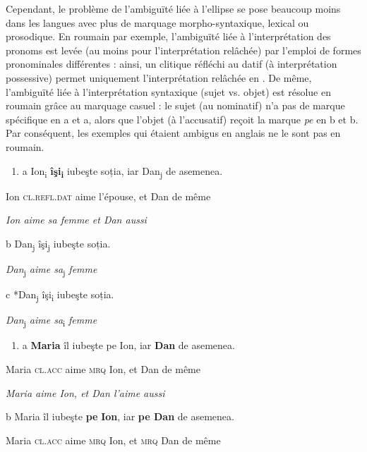 Cependant, le problème de l'ambiguïté liée à l'ellipse se pose beaucoup moins dans les langues avec plus de marquage morpho-syntaxique, lexical ou prosodique. En roumain par exemple, l'ambiguïté liée à l'interprétation des pronoms est levée (au moins pour l'interprétation relâchée) par l'emploi de formes pronominales différentes : ainsi, un clitique réfléchi au datif (à interprétation possessive) permet uniquement l'interprétation relâchée en . De même, l'ambiguïté liée à l'interprétation syntaxique (sujet vs. objet) est résolue en roumain grâce au marquage casuel : le sujet (au nominatif) n'a pas de marque spécifique en a et a, alors que l'objet (à l'accusatif) reçoit la marque \textit{pe} en b et b. Par conséquent, les exemples qui étaient ambigus en anglais ne le sont pas en roumain. 


\begin{enumerate}
\item \label{bkm:Ref286961281}a  Ion\textsubscript{i}  \textbf{îşi}\textbf{\textsubscript{i}}  iubeşte  soția,  iar  Dan\textsubscript{j}  de asemenea. 


\end{enumerate}
Ion  \textsc{cl.refl.dat}  aime  l'épouse,  et  Dan  de même

{\itshape
Ion aime sa femme et Dan aussi}

b  Dan\textsubscript{j} îşi\textsubscript{j} iubeşte soția. 

  \textit{Dan}\textsubscript{j}\textit{ aime sa}\textsubscript{j}\textit{ femme} 

c  *Dan\textsubscript{j} îşi\textsubscript{i} iubeşte soția. 

  \textit{Dan}\textsubscript{j}\textit{ aime sa}\textsubscript{i}\textit{ femme}


\begin{enumerate}
\item \label{bkm:Ref302553088}a  \textbf{Maria}  îl  iubeşte  pe  Ion,  iar  \textbf{Dan}  de asemenea. 


\end{enumerate}
Maria  \textsc{cl.acc}  aime  \textsc{mrq}  Ion,  et  Dan  de même

{\itshape
Maria aime Ion, et Dan l'aime aussi} 

b  Maria  îl  iubeşte  \textbf{pe}  \textbf{Ion},  iar  \textbf{pe  Dan}  de asemenea. 

Maria  \textsc{cl.acc}  aime  \textsc{mrq}  Ion,  et  \textsc{mrq}  Dan  de même

